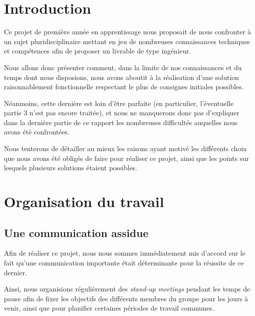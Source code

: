 \documentclass[a4paper, 11pt, twoside]{book}
\begin{document}

\chapter*{Introduction}

Ce projet de première année en apprentissage nous proposait de nous confronter à un sujet pluridisciplinaire mettant en jeu de nombreuses connaissances techniques et compétences afin de proposer un livrable de type ingénieur.

Nous allons donc présenter comment, dans la limite de nos connaissances et du temps dont nous disposions, nous avons aboutit à la réalisation d'une solution raisonnablement fonctionnelle respectant le plus de consignes initiales possibles.

Néanmoins, cette dernière est loin d'être parfaite (en particulier, l'éventuelle partie 3 n'est pas encore traitée), et nous ne manquerons donc pas d'expliquer dans la dernière partie de ce rapport les nombreuses difficultés auquelles nous avons été confrontées.

Nous tenterons de détailler au mieux les raisons ayant motivé les différents choix que nous avons été obligés de faire pour réaliser ce projet, ainsi que les points sur lesquels plusieurs solutions étaient possibles.

\chapter{Organisation du travail}
\section{Une communication assidue}

Afin de réaliser ce projet, nous nous sommes immédiatement mis d'accord sur le fait qu'une communication importante était déterminante pour la réussite de ce dernier.

Ainsi, nous organisions régulièrement des \emph{stand-up meetings} pendant les temps de pause afin de fixer les objectifs des différents membres du groupe pour les jours à venir, ainsi que pour planifier certaines périodes de travail communes.
\end{document}
